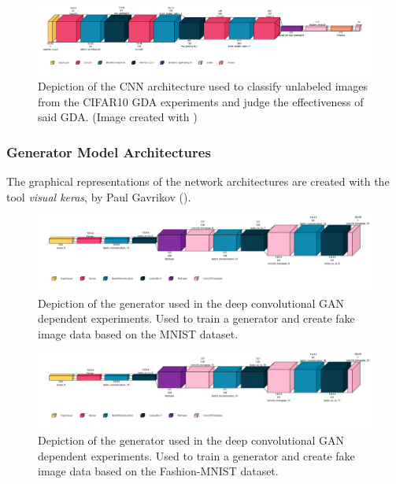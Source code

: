 \begin{figure}[htbp]
    \centering
    \vspace{-2em}
    \includegraphics[width=.9\textwidth]{abb/netron_network_archs/classifying_Classifier_Cifar10.png}
    \caption{Depiction of the CNN architecture used to classify unlabeled images from the CIFAR10 GDA experiments and judge the effectiveness of said GDA. (Image created with \cite{Gavrikov2020VisualKeras})}
    \label{fig:figure_class_cifar10}
\end{figure}
\newpage

\subsubsection{Generator Model Architectures}\label{appendix_generator_architectures}
The graphical representations of the network architectures are created with the tool \textit{visual keras}, by Paul Gavrikov (\cite{Gavrikov2020VisualKeras}).

\begin{figure}[htbp]
    \centering
    \includegraphics[width=.9\textwidth]{abb/netron_network_archs/define_vanilla_mnist_gen.png}
    \caption{Depiction of the generator used in the deep convolutional GAN dependent experiments. Used to train a generator and create fake image data based on the MNIST dataset.}
    \label{fig:figure_gen_arch_vanilla_mnist}
\end{figure}

\begin{figure}[htbp]
    \centering
    \includegraphics[width=.9\textwidth]{abb/netron_network_archs/define_vanilla_fashion_mnist_gen.png}
    \caption{Depiction of the generator used in the deep convolutional GAN dependent experiments. Used to train a generator and create fake image data based on the Fashion-MNIST dataset.}
    \label{fig:figure_gen_arch_vanilla_fashion}
\end{figure}


